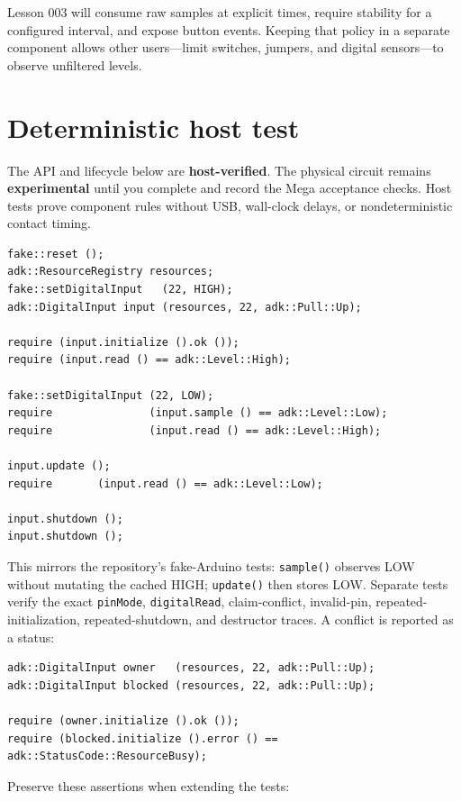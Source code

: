 \documentclass[11pt]{article}
\begin{document}
Lesson 003 will consume raw samples at explicit times, require stability for a
configured interval, and expose button events. Keeping that policy in a separate
component allows other users---limit switches, jumpers, and digital sensors---to
observe unfiltered levels.

\section{Deterministic host test}

The API and lifecycle below are \textbf{host-verified}. The physical circuit
remains \textbf{experimental} until you complete and record the Mega acceptance
checks. Host tests prove component rules without USB, wall-clock delays, or
nondeterministic contact timing.

\begin{lstlisting}[style=adkcpp]
fake::reset ();
adk::ResourceRegistry resources;
fake::setDigitalInput   (22, HIGH);
adk::DigitalInput input (resources, 22, adk::Pull::Up);

require (input.initialize ().ok ());
require (input.read () == adk::Level::High);

fake::setDigitalInput (22, LOW);
require               (input.sample () == adk::Level::Low);
require               (input.read () == adk::Level::High);

input.update ();
require       (input.read () == adk::Level::Low);

input.shutdown ();
input.shutdown ();
\end{lstlisting}

This mirrors the repository's fake-Arduino tests: \texttt{sample()} observes LOW
without mutating the cached HIGH; \texttt{update()} then stores LOW. Separate
tests verify the exact \texttt{pinMode}, \texttt{digitalRead}, claim-conflict,
invalid-pin, repeated-initialization, repeated-shutdown, and destructor traces.
A conflict is reported as a status:

\begin{lstlisting}[style=adkcpp]
adk::DigitalInput owner   (resources, 22, adk::Pull::Up);
adk::DigitalInput blocked (resources, 22, adk::Pull::Up);

require (owner.initialize ().ok ());
require (blocked.initialize ().error () == adk::StatusCode::ResourceBusy);
\end{lstlisting}

Preserve these assertions when extending the tests:
\end{document}
